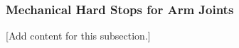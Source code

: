 
\subsubsection{Mechanical Hard Stops for Arm Joints}
\label{subsubsec:design_4_6_mechanical_hard_stops_arm_joints}

[Add content for this subsection.]
